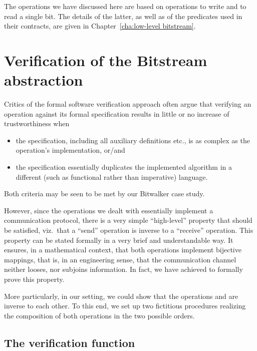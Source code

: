 The operations we have discussed here are based
on operations to write and to read a single bit.
%
The details of the latter, as well as of the predicates used in their
contracts, are given in Chapter~\ref{cha:low-level bitstream}.

\clearpage


\section{Verification of the Bitstream abstraction}
\label{sec:bitstream verif}



Critics of the formal software verification approach often 
argue that verifying an operation against its formal specification
results in little or no increase of trustworthiness when
%
\begin{itemize}
\item the specification, including all auxiliary definitions etc., is
	as complex as the operation's implementation, or/and
\item the specification essentially duplicates the implemented
	algorithm in a different (such as functional rather than
	imperative) language.
\end{itemize}
%
Both criteria may be seen to be met by our Bitwalker case study.



However, since the operations we dealt with essentially implement a
communication protocol, there is a very simple ``high-level'' property
that should be satisfied, viz.\ that a ``send'' operation is inverse
to a ``receive'' operation.
%
This property can be stated formally in a very brief and understandable
way.
%
It ensures, in a mathematical context, that both operations implement
bijective mappings, that is, in an engineering sense, that the
communication channel neither looses, nor subjoins information.
%
In fact, we have achieved to formally prove this property.




More particularly, in our setting, we could show that the operations
 and  are
inverse to each other.
%
To this end, we set up two fictitious \isoc procedures realizing
the composition of both operations in the two possible orders.

\subsection{The verification function }

